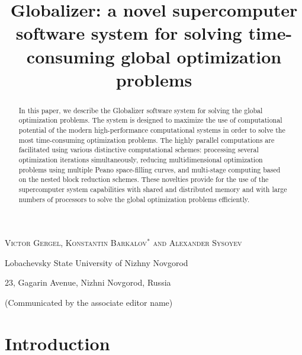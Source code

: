 \documentclass{aims}
\title[Globalizer: a supercomputer software] %
      {Globalizer: a novel supercomputer software system for solving time-consuming global optimization problems}
\author[V. P. Gergel, K. A. Barkalov and A. V. Sysoyev]{}
\theoremstyle{definition}
\begin{document}
\maketitle


\centerline{\scshape Victor Gergel, Konstantin  Barkalov$^*$ and Alexander Sysoyev}
\medskip
{\footnotesize
 \centerline{Lobachevsky State University of Nizhny Novgorod}
   \centerline{23, Gagarin Avenue, Nizhni Novgorod, Russia}
}

\bigskip

 \centerline{(Communicated by the associate editor name)}


\begin{abstract}
In this paper, we describe the Globalizer software system for solving the global
optimization problems. The system is designed to maximize the use of computational
potential of the modern high-performance computational systems in order to solve the
most time-consuming optimization problems. The highly parallel computations are facilitated
using various distinctive computational schemes: processing several optimization
iterations simultaneously, reducing multidimensional optimization problems using multiple
Peano space-filling curves, and multi-stage computing based on the nested block reduction schemes.
These novelties provide for the use of the supercomputer system capabilities with shared
and distributed memory and with large numbers of processors to solve the global
optimization problems efficiently.
\end{abstract}

\section{Introduction}\label{sec:intro}
\end{document}
